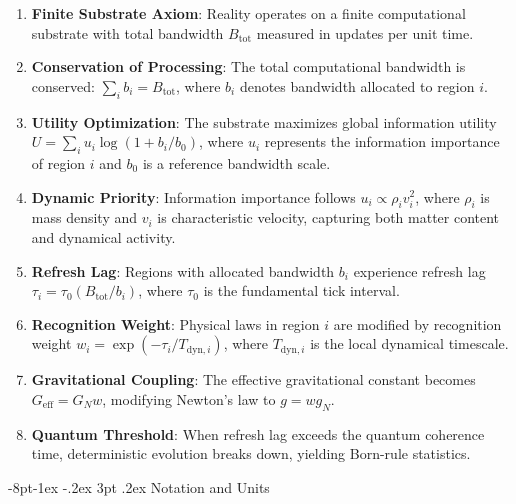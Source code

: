 \documentclass[12pt,letterpaper]{book}
\makeatletter
\renewcommand\subsection{\@startsection{subsection}{2}{\z@}%
  {-6pt\@plus -1ex \@minus -.2ex}%
  {3pt \@plus .2ex}%
  {\normalfont\normalsize\bfseries}}
\renewcommand\subsection{\@startsection{subsection}{2}{\z@}%
                {-8pt\@plus -1ex \@minus -.2ex}%
                {3pt \@plus .2ex}%
                {\normalfont\normalsize\bfseries}}
\makeatother
\begin{document}
\begin{enumerate}
\item \textbf{Finite Substrate Axiom}: Reality operates on a finite computational substrate with total bandwidth $B_{\text{tot}}$ measured in updates per unit time.

\item \textbf{Conservation of Processing}: The total computational bandwidth is conserved: $\sum_i b_i = B_{\text{tot}}$, where $b_i$ denotes bandwidth allocated to region $i$.

\item \textbf{Utility Optimization}: The substrate maximizes global information utility $U = \sum_i u_i \log(1 + b_i/b_0)$, where $u_i$ represents the information importance of region $i$ and $b_0$ is a reference bandwidth scale.

\item \textbf{Dynamic Priority}: Information importance follows $u_i \propto \rho_i v_i^2$, where $\rho_i$ is mass density and $v_i$ is characteristic velocity, capturing both matter content and dynamical activity.

\item \textbf{Refresh Lag}: Regions with allocated bandwidth $b_i$ experience refresh lag $\tau_i = \tau_0(B_{\text{tot}}/b_i)$, where $\tau_0$ is the fundamental tick interval.

\item \textbf{Recognition Weight}: Physical laws in region $i$ are modified by recognition weight $w_i = \exp(-\tau_i/T_{\text{dyn},i})$, where $T_{\text{dyn},i}$ is the local dynamical timescale.

\item \textbf{Gravitational Coupling}: The effective gravitational constant becomes $G_{\text{eff}} = G_N w$, modifying Newton's law to $g = w g_N$.

\item \textbf{Quantum Threshold}: When refresh lag exceeds the quantum coherence time, deterministic evolution breaks down, yielding Born-rule statistics.
\end{enumerate}

\subsection{Notation and Units}
\end{document}

